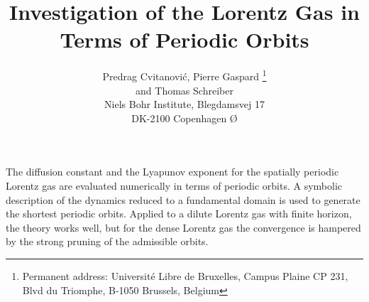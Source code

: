 


\newcommand{\be}{\begin{equation}}
\newcommand{\ee}{\end{equation}}
\newcommand{\bes}{\begin{eqnarray}}
\newcommand{\ees}{\end{eqnarray}}
\newcommand\PP{\cal P}
\newcommand\tr{{\rm tr}}
\newcommand\sumprime{\mathop{{\sum}'}}
\newcommand\hflow{\hat{\phi}^t}
\newcommand\flow{\phi^t}
\newcommand\hn{\hat n}
\newcommand\hM{\hat M}
\newcommand\tim{\tau_p}
\newcommand\hx{\hat x}


\title{Investigation of the Lorentz Gas in Terms of Periodic Orbits}

\author{
Predrag Cvitanovi\'c,
Pierre Gaspard \thanks{Permanent address:
          Universit\'e Libre de Bruxelles, Campus Plaine CP 231,
          Blvd du Triomphe, B-1050 Brussels, Belgium}\\
and Thomas Schreiber\\
   Niels Bohr Institute, Blegdamsvej 17\\ DK-2100 Copenhagen \O}

\maketitle

The diffusion constant and the Lyapunov exponent
for the spatially periodic Lorentz gas are evaluated
numerically in terms of periodic orbits.
A symbolic description of the dynamics reduced to a fundamental domain is
used to generate the shortest periodic orbits.
Applied to a dilute Lorentz gas with finite horizon, the
theory works well, but for the dense Lorentz gas the convergence
is hampered by the strong pruning of the admissible orbits.
\eject

